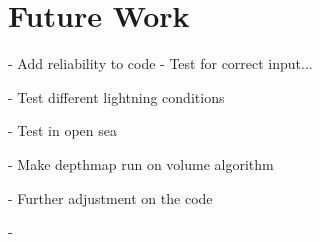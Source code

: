 \section{Future Work}


- Add reliability to code
    - Test for correct input...

- Test different lightning conditions

- Test in open sea

- Make depthmap run on volume algorithm

- Further adjustment on the code

- 
